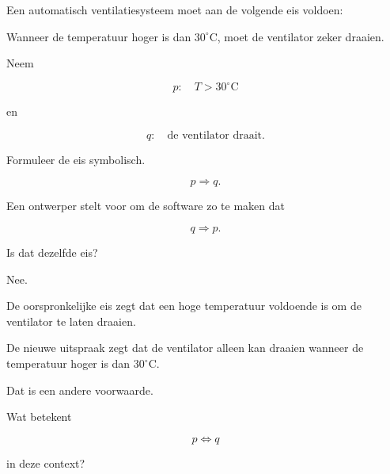 \documentclass{ximera}
\begin{document}
\begin{oefening}{\oefG}

Een automatisch ventilatiesysteem moet aan de volgende eis voldoen:

\begin{center}
Wanneer de temperatuur hoger is dan $30^\circ\mathrm{C}$,
moet de ventilator zeker draaien.
\end{center}

Neem

\[
p:\quad T>30^\circ\mathrm{C}
\]

en

\[
q:\quad \text{de ventilator draait}.
\]

\begin{question}

Formuleer de eis symbolisch.

\begin{oplossing}

\[
p\Rightarrow q.
\]

\end{oplossing}

\end{question}


\begin{question}

Een ontwerper stelt voor om de software zo te maken dat

\[
q\Rightarrow p.
\]

Is dat dezelfde eis?

\begin{oplossing}

Nee.

De oorspronkelijke eis zegt dat een hoge temperatuur voldoende is om
de ventilator te laten draaien.

De nieuwe uitspraak zegt dat de ventilator alleen kan draaien wanneer
de temperatuur hoger is dan $30^\circ\mathrm{C}$.

Dat is een andere voorwaarde.

\end{oplossing}

\end{question}


\begin{question}

Wat betekent

\[
p\Leftrightarrow q
\]

in deze context?

\begin{oplossing}


\end{oplossing}
\end{question}
\end{oefening}
\end{document}
